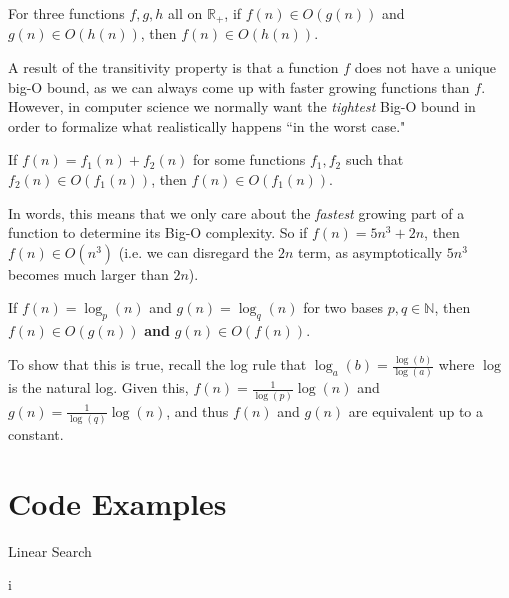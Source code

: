 \begin{flex}
    \begin{definition}[Transitivity]\label{def:bigO::trans}
    For three functions $f, g, h$ all on $\mathbb{R}_+$, if $f(n) \in O(g(n))$ and $g(n) \in O(h(n))$, then $f(n) \in O(h(n))$.
\end{definition}

A result of the transitivity property is that a function $f$ does not have a unique big-O bound, as we can always come up with faster growing functions than $f$. However, in computer science we normally want the \emph{tightest} Big-O bound in order to formalize what realistically happens ``in the worst case."
\end{flex}


\begin{flex}
    \begin{definition}\label{def:bigO::loa}
    If $f(n) = f_1(n) + f_2(n)$ for some functions $f_1, f_2$ such that $f_2(n) \in O(f_1(n))$, then $f(n) \in O(f_1(n))$.
\end{definition}

In words, this means that we only care about the \emph{fastest} growing part of a function to determine its Big-O complexity. So if $f(n) = 5n^3 + 2n$, then $f(n) \in O(n^3)$ (i.e. we can disregard the $2n$ term, as asymptotically $5n^3$ becomes much larger than $2n$).
\end{flex}

\begin{flex}
    \begin{definition}\label{def:bigO::le}
    If $f(n) = \log_p(n)$ and $g(n) = \log_q(n)$ for two bases $p, q \in \mathbb{N}$, then $f(n) \in O(g(n))$ \textbf{and} $g(n) \in O(f(n))$.
\end{definition}

To show that this is true, recall the log rule that $\log_a(b) = \frac{\log(b)}{\log(a)}$ where $\log$ is the natural log. Given this, $f(n) = \frac{1}{\log(p)}\log(n)$ and $g(n) = \frac{1}{\log(q)}\log(n)$, and thus $f(n)$ and $g(n)$ are equivalent up to a constant.
\end{flex}


\section{Code Examples}

\begin{algorithm}[H]
    \caption{Linear Search}
    \label{alg:log-sum-exp-trick}
    \begin{algorithmic}[1]
                \Return i
                \EndIf
                \Else{$$}
            \EndFor
        \EndProcedure
    \end{algorithmic}
\end{algorithm}